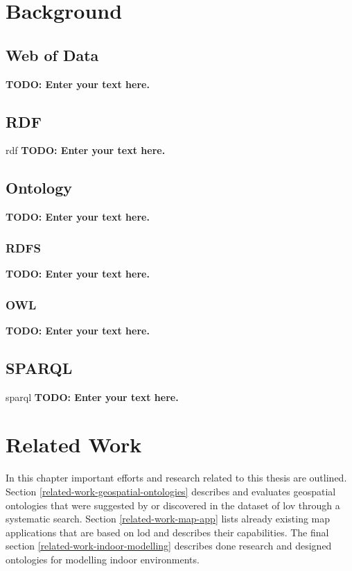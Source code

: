 \documentclass[draft,final]{vutinfth} %
\newcommand{\todo}[1]{{\color{red}\textbf{TODO: {#1}}}} %
\begin{document}
\chapter{Background}
\label{background-chapter}

\section{Web of Data}
\todo{Enter your text here.}

\section{RDF}
\gls{rdf}
\todo{Enter your text here.}

\section{Ontology}
\todo{Enter your text here.}

\subsection{RDFS}
\todo{Enter your text here.}

\subsection{OWL}
\todo{Enter your text here.}

\section{SPARQL}
\gls{sparql}
\todo{Enter your text here.}

\chapter{Related Work}
\label{related-work-chapter}

In this chapter important efforts and research related to this thesis are outlined. Section \ref{related-work-geospatial-ontologies} describes and evaluates geospatial ontologies that were suggested by \cite{tandy_spatial_2016} or discovered in the dataset of \gls{lov} through a systematic search. Section \ref{related-work-map-app} lists already existing map applications that are based on \gls{lod} and describes their capabilities. The final section \ref{related-work-indoor-modelling} describes done research and designed ontologies for modelling indoor environments.
\end{document}
